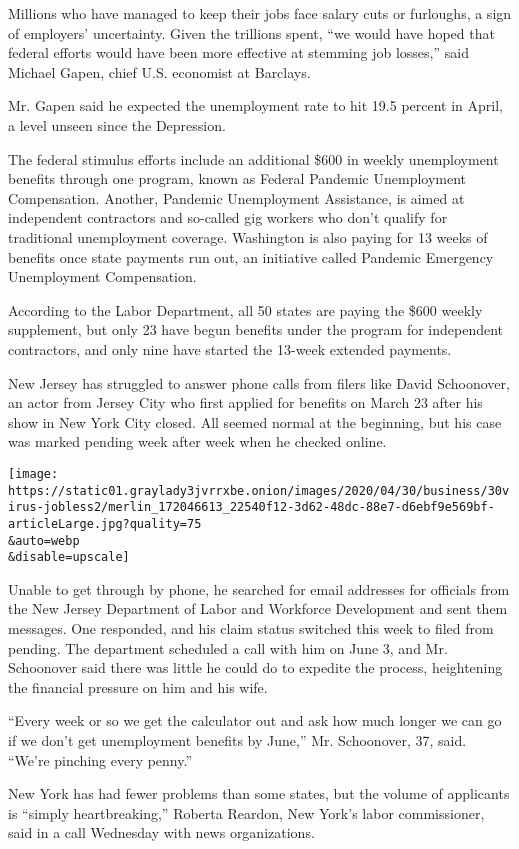 Millions who have managed to keep their jobs face salary cuts or
furloughs, a sign of employers' uncertainty. Given the trillions spent,
``we would have hoped that federal efforts would have been more
effective at stemming job losses,'' said Michael Gapen, chief U.S.
economist at Barclays.

Mr. Gapen said he expected the unemployment rate to hit 19.5 percent in
April, a level unseen since the Depression.

The federal stimulus efforts include an additional \$600 in weekly
unemployment benefits through one program, known as Federal Pandemic
Unemployment Compensation. Another, Pandemic Unemployment Assistance, is
aimed at independent contractors and so-called gig workers who don't
qualify for traditional unemployment coverage. Washington is also paying
for 13 weeks of benefits once state payments run out, an initiative
called Pandemic Emergency Unemployment Compensation.

According to the Labor Department, all 50 states are paying the \$600
weekly supplement, but only 23 have begun benefits under the program for
independent contractors, and only nine have started the 13-week extended
payments.

New Jersey has struggled to answer phone calls from filers like David
Schoonover, an actor from Jersey City who first applied for benefits on
March 23 after his show in New York City closed. All seemed normal at
the beginning, but his case was marked pending week after week when he
checked online.

\texttt{[image: https://static01.graylady3jvrrxbe.onion/images/2020/04/30/business/30virus-jobless2/merlin\_172046613\_22540f12-3d62-48dc-88e7-d6ebf9e569bf-articleLarge.jpg?quality=75\\\&auto=webp\\\&disable=upscale]}

Unable to get through by phone, he searched for email addresses for
officials from the New Jersey Department of Labor and Workforce
Development and sent them messages. One responded, and his claim status
switched this week to filed from pending. The department scheduled a
call with him on June 3, and Mr. Schoonover said there was little he
could do to expedite the process, heightening the financial pressure on
him and his wife.

``Every week or so we get the calculator out and ask how much longer we
can go if we don't get unemployment benefits by June,'' Mr. Schoonover,
37, said. ``We're pinching every penny.''

New York has had fewer problems than some states, but the volume of
applicants is ``simply heartbreaking,'' Roberta Reardon, New York's
labor commissioner, said in a call Wednesday with news organizations.

